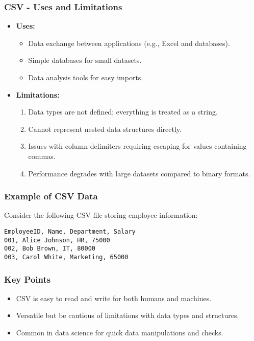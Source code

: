 \documentclass[aspectratio=169]{beamer}
\begin{document}
\begin{frame}[fragile]
    \frametitle{CSV - Uses and Limitations}
    \begin{itemize}
        \item \textbf{Uses:}
        \begin{itemize}
            \item Data exchange between applications (e.g., Excel and databases).
            \item Simple databases for small datasets.
            \item Data analysis tools for easy imports.
        \end{itemize}
        
        \item \textbf{Limitations:}
        \begin{enumerate}
            \item Data types are not defined; everything is treated as a string.
            \item Cannot represent nested data structures directly.
            \item Issues with column delimiters requiring escaping for values containing commas.
            \item Performance degrades with large datasets compared to binary formats.
        \end{enumerate}
    \end{itemize}
\end{frame}

\begin{frame}[fragile]
    \frametitle{Example of CSV Data}
    Consider the following CSV file storing employee information:
    \begin{lstlisting}
EmployeeID, Name, Department, Salary
001, Alice Johnson, HR, 75000
002, Bob Brown, IT, 80000
003, Carol White, Marketing, 65000
    \end{lstlisting}
\end{frame}

\begin{frame}[fragile]
    \frametitle{Key Points}
    \begin{itemize}
        \item CSV is easy to read and write for both humans and machines.
        \item Versatile but be cautious of limitations with data types and structures.
        \item Common in data science for quick data manipulations and checks.
    \end{itemize}
\end{frame}
\end{document}
